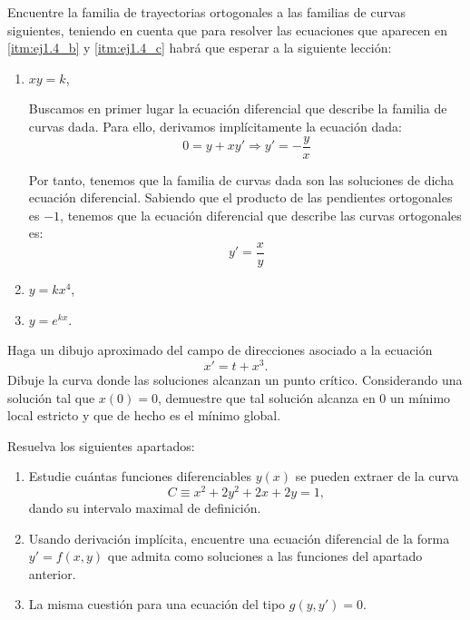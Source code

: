 \begin{ejercicio}
    Encuentre la familia de trayectorias ortogonales a las familias de curvas siguientes, teniendo en cuenta que para resolver las ecuaciones que aparecen en \ref{itm:ej1.4_b} y \ref{itm:ej1.4_c} habrá que esperar a la siguiente lección:
    \begin{enumerate}
        \item \(xy = k\),
        
        Buscamos en primer lugar la ecuación diferencial que describe la familia de curvas dada. Para ello, derivamos implícitamente la ecuación dada:
        \begin{equation*}
            0 = y + xy' \Longrightarrow y' = -\dfrac{y}{x}
        \end{equation*}

        Por tanto, tenemos que la familia de curvas dada son las soluciones de dicha ecuación diferencial.
        Sabiendo que el producto de las pendientes ortogonales es $-1$, tenemos que la ecuación diferencial que describe las curvas ortogonales es:
        \begin{equation*}
            y' = \dfrac{x}{y}
        \end{equation*}
        
        \item\label{itm:ej1.4_b} \(y = kx^4\),
        \item\label{itm:ej1.4_c} \(y = e^{kx}\).
    \end{enumerate}
\end{ejercicio}


\begin{ejercicio}
    Haga un dibujo aproximado del campo de direcciones asociado a la ecuación
    \begin{equation*}
        x' = t + x^3.
    \end{equation*}
    Dibuje la curva donde las soluciones alcanzan un punto crítico. Considerando una solución tal que \(x(0) = 0\), demuestre que tal solución alcanza en 0 un mínimo local estricto y que de hecho es el mínimo global.
\end{ejercicio}


\begin{ejercicio} Resuelva los siguientes apartados:
    \begin{enumerate}
        \item Estudie cuántas funciones diferenciables \(y(x)\) se pueden extraer de la curva
        \begin{equation*}
            C \equiv x^2 + 2y^2 + 2x + 2y = 1,
        \end{equation*}
        dando su intervalo maximal de definición.
        \item Usando derivación implícita, encuentre una ecuación diferencial de la forma \(y' = f(x, y)\) que admita como soluciones a las funciones del apartado anterior.
        \item La misma cuestión para una ecuación del tipo \(g(y, y') = 0\).
    \end{enumerate}
\end{ejercicio}


